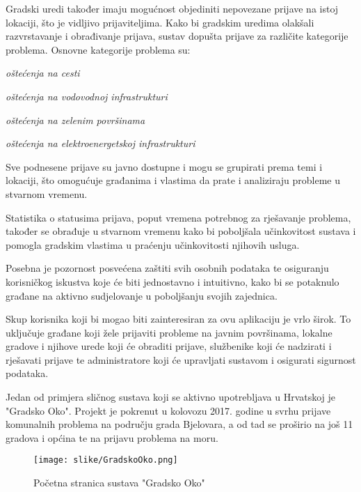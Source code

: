 \noindent Gradski uredi također imaju mogućnost objediniti nepovezane prijave na istoj lokaciji, što je vidljivo prijaviteljima.
\noindent Kako bi gradskim uredima olakšali razvrstavanje i obrađivanje prijava, sustav dopušta prijave za različite kategorije problema. Osnovne kategorije problema su:

\begin{packed_item}
	\item \textit{oštećenja na cesti}
	\item \textit{oštećenja na vodovodnoj infrastrukturi}
	\item \textit{oštećenja na zelenim površinama}
	\item \textit{oštećenja na elektroenergetskoj infrastrukturi}
\end{packed_item}

\noindent Sve podnesene prijave su javno dostupne i mogu se grupirati prema temi i lokaciji, što omogućuje građanima i vlastima da prate i analiziraju probleme u stvarnom vremenu.

\noindent Statistika o statusima prijava, poput vremena potrebnog za rješavanje problema, također se obrađuje u stvarnom vremenu kako bi poboljšala učinkovitost sustava i pomogla gradskim vlastima u praćenju učinkovitosti njihovih usluga.

\noindent Posebna je pozornost posvećena zaštiti svih osobnih podataka te osiguranju korisničkog iskustva koje će biti jednostavno i intuitivno, kako bi se potaknulo građane na aktivno sudjelovanje u poboljšanju svojih zajednica.

\noindent Skup korisnika koji bi mogao biti zainteresiran za ovu aplikaciju je vrlo širok. To uključuje građane koji žele prijaviti probleme na javnim površinama, lokalne gradove i njihove urede koji će obraditi prijave, službenike koji će nadzirati i rješavati prijave te administratore koji će upravljati sustavom i osigurati sigurnost podataka.

\noindent Jedan od primjera sličnog sustava koji se aktivno upotrebljava u Hrvatskoj je "Gradsko Oko". Projekt je pokrenut u kolovozu 2017. godine u svrhu prijave komunalnih problema na području grada Bjelovara, a od tad se proširio na još 11 gradova i općina te na prijavu problema na moru.

\begin{figure}[H]
	\texttt{[image: slike/GradskoOko.png]} %
	\centering
	\caption{Početna stranica sustava "Gradsko Oko"}
	\label{fig:GradskoOkoPrimjer}
\end{figure}

